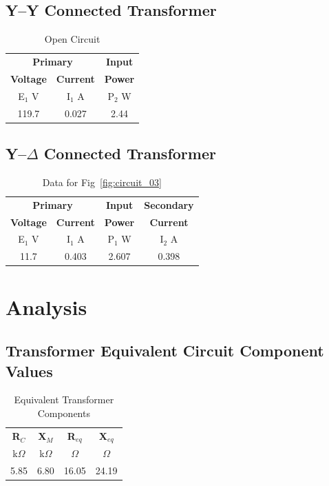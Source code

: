 \documentclass{article}
\begin{document}
\subsection{Y--Y Connected Transformer}
\begin{table}[H]
  \centering
  \begin{tabular}{*{3}{c}}
    \multicolumn{2}{c}{\textbf{Primary}} & \textbf{Input} \\
    \textbf{Voltage} & \textbf{Current} & \textbf{Power} \\
    E$_1$ V & I$_1$ A & P$_2$ W \\
    \hline
    119.7 & 0.027 & 2.44 \\
  \end{tabular}
  \caption{Open Circuit}
  \label{tab:open_circ}
\end{table}

\subsection{Y--$\Delta$ Connected Transformer}
\begin{table}[H]
  \centering
  \begin{tabular}{*{4}{c}}
    \multicolumn{2}{c}{\textbf{Primary}} & \textbf{Input} & \textbf{Secondary} \\
    \textbf{Voltage} & \textbf{Current} & \textbf{Power} & \textbf{Current} \\
    E$_1$ V & I$_1$ A & P$_1$ W & I$_2$ A \\
    \hline
    11.7 & 0.403 & 2.607 & 0.398 \\
  \end{tabular}
  \caption{Data for Fig~\ref{fig:circuit_03}}
  \label{tab:short_circ}
\end{table}

\section{Analysis}
\subsection{Transformer Equivalent Circuit Component Values}
\begin{table}[H]
  \centering
  \begin{tabular}{*{4}{c}}
    \textbf{R$_C$} & \textbf{X$_M$}
    & \textbf{R$_{eq}$} & \textbf{X$_{eq}$} \\
    k$\Omega$ & k$\Omega$ &$\Omega$ & $\Omega$ \\
    \hline
    5.85 & 6.80 & 16.05 & 24.19 \\
  \end{tabular}
  \caption{Equivalent Transformer Components}
  \label{tab:equiv_comp}
\end{table}
\end{document}
